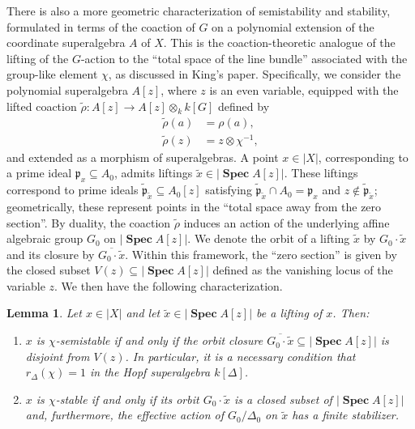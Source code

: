 \documentclass[11pt,a4paper,reqno,noamsfonts]{amsart}
\numberwithin{equation}{section}
\newtheorem{lemma}[theorem]{Lemma}
\theoremstyle{definition}
\theoremstyle{remark}
\newcommand{\pfrak}{\ensuremath{\mathfrak{p}}}
\DeclareMathOperator{\sSpec}{\mathbf{Spec}}
\begin{document}
There is also a more geometric characterization of semistability and stability, formulated in terms of the coaction of $G$ on a polynomial extension of the coordinate superalgebra $A$ of $X$. This is the coaction-theoretic analogue of the lifting of the $G$-action to the ``total space of the line bundle'' associated with the group-like element $\chi$, as discussed in King's paper. Specifically, we consider the polynomial superalgebra $A[z]$, where $z$ is an even variable, equipped with the lifted coaction $\tilde{\rho} \colon A[z] \to A[z] \otimes_k k[G]$ defined by
\begin{equation}
\begin{aligned}
\tilde{\rho}(a)&=\rho (a), \\
\tilde{\rho}(z)&=z\otimes \chi ^{-1},
\end{aligned}
\end{equation}
and extended as a morphism of superalgebras. A point $x \in \lvert X \rvert$, corresponding to a prime ideal $\pfrak_x \subseteq A_0$, admits liftings $\tilde{x} \in \lvert \sSpec A[z] \rvert$. These liftings correspond to prime ideals $\tilde{\pfrak}_{\tilde{x}} \subseteq A_0[z]$ satisfying $\tilde{\pfrak}_{\tilde{x}} \cap A_0 = \pfrak_x$ and $z \notin \tilde{\pfrak}_{\tilde{x}}$; geometrically, these represent points in the ``total space away from the zero section''. By duality, the coaction $\tilde{\rho}$ induces an action of the underlying affine algebraic group $G_{0}$ on $\lvert \sSpec A[z] \rvert$. We denote the orbit of a lifting $\tilde{x}$ by $G_0 \cdot \tilde{x}$ and its closure by $\overline{G_{0}\cdot \tilde{x}}$. Within this framework, the ``zero section'' is given by the closed subset $V(z) \subseteq \lvert \sSpec A[z] \rvert$ defined as the vanishing locus of the variable $z$. We then have the following characterization.

\begin{lemma}\label{lem:4.8}
Let $x \in \lvert X \rvert$ and let $\tilde{x} \in \lvert \sSpec A[z] \rvert$ be a lifting of $x$. Then:
\begin{enumerate}
\item $x$ is $\chi$-semistable if and only if the orbit closure $\overline{G_0 \cdot \tilde{x}} \subseteq \lvert \sSpec A[z] \rvert$ is disjoint from $V(z)$. In particular, it is a necessary condition that $r_{\Delta}(\chi) = 1$ in the Hopf superalgebra $k[\Delta]$.

\item $x$ is $\chi$-stable if and only if its orbit $G_0 \cdot \tilde{x}$ is a closed subset of $\lvert \sSpec A[z] \rvert$ and, furthermore, the effective action of $G_0/\Delta_0$ on $\tilde{x}$ has a finite stabilizer.
\end{enumerate}
\end{lemma}
\end{document}
